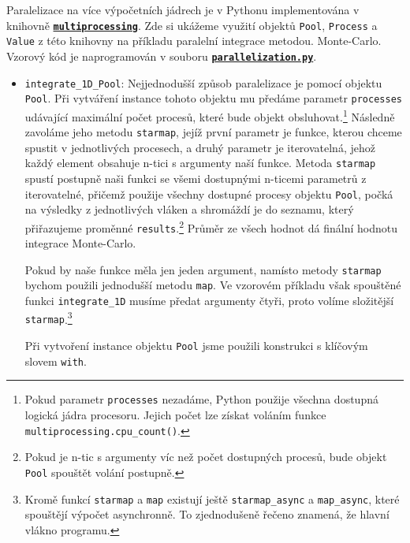 \documentclass[a4paper,11pt,twoside]{article}
\def\code#1{\textnormal{\texttt{#1}}}
\def\file#1{\textnormal{\textbf{\texttt{#1}}}}
\def\ghfile#1#2{\textnormal{\textbf{\texttt{\href{https://github.com/PavelStransky/PCInPhysics/blob/main/#1#2}{#2}}}}}
\theoremstyle{red}
\theoremstyle{green}
\begin{document}
    Paralelizace na více výpočetních jádrech je v Pythonu implementována v knihovně \file{\href{https://docs.python.org/3/library/multiprocessing.html}{mul\-ti\-pro\-ces\-sing}}.
    Zde si ukážeme využití objektů \code{Pool}, \code{Process} a \code{Value} z této knihovny na příkladu paralelní integrace metodou. Monte-Carlo.
    Vzorový kód je naprogramován v souboru \ghfile{python/montecarlo/}{parallelization.py}.
    \begin{itemize}
        \item \code{integrate_1D_Pool}:
            Nejjednodušší způsob paralelizace je pomocí objektu \code{Pool}. 
            Při vytváření instance tohoto objektu mu předáme parametr \code{processes} udávající maximální počet procesů, které bude objekt obsluhovat.\footnote{
                Pokud parametr \code{processes} nezadáme, Python použije všechna dostupná logická jádra procesoru. 
                Jejich počet lze získat voláním funkce \code{multiprocessing.cpu\_count()}.
            }
            Následně zavoláme jeho metodu \code{starmap}, jejíž první parametr je funkce, kterou chceme spustit v jednotlivých procesech, a druhý parametr je iterovatelná, jehož každý element obsahuje n-tici s argumenty naší funkce.
            Metoda \code{starmap} spustí postupně naši funkci se všemi dostupnými n-ticemi parametrů z iterovatelné, přičemž použije všechny dostupné procesy objektu \code{Pool},
            počká na výsledky z jednotlivých vláken a shromáždí je do seznamu, který přiřazujeme proměnné \code{results}.\footnote{
                Pokud je n-tic s argumenty víc než počet dostupných procesů, bude objekt \code{Pool} spouštět volání postupně.
            }
            Průměr ze všech hodnot dá finální hodnotu integrace Monte-Carlo.

            Pokud by naše funkce měla jen jeden argument, namísto metody \code{starmap} bychom použili jednodušší metodu \code{map}.
            Ve vzorovém příkladu však spouštěné funkci \code{integrate_1D} musíme předat argumenty čtyři, proto volíme složitější \code{starmap}.\footnote{
                Kromě funkcí \code{starmap} a \code{map} existují ještě \code{starmap_async} a \code{map_async}, které spouštějí výpočet asynchronně. To zjednodušeně řečeno znamená, že hlavní vlákno programu.
            }

            Při vytvoření instance objektu \code{Pool} jsme použili konstrukci s klíčovým slovem \code{with}.


\end{itemize}
\end{document}
